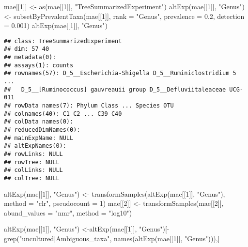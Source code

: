 \documentclass[
  oneside]{book}
\newenvironment{Shaded}{\begin{snugshade}}{\end{snugshade}}
\newcommand{\AttributeTok}[1]{\textcolor[rgb]{0.77,0.63,0.00}{#1}}
\newcommand{\DecValTok}[1]{\textcolor[rgb]{0.00,0.00,0.81}{#1}}
\newcommand{\FloatTok}[1]{\textcolor[rgb]{0.00,0.00,0.81}{#1}}
\newcommand{\FunctionTok}[1]{\textcolor[rgb]{0.00,0.00,0.00}{#1}}
\newcommand{\NormalTok}[1]{#1}
\newcommand{\OtherTok}[1]{\textcolor[rgb]{0.56,0.35,0.01}{#1}}
\newcommand{\SpecialCharTok}[1]{\textcolor[rgb]{0.00,0.00,0.00}{#1}}
\newcommand{\StringTok}[1]{\textcolor[rgb]{0.31,0.60,0.02}{#1}}
\begin{document}
\begin{Shaded}
\begin{Highlighting}[]
\NormalTok{mae[[}\DecValTok{1}\NormalTok{]] }\OtherTok{\textless{}{-}} \FunctionTok{as}\NormalTok{(mae[[}\DecValTok{1}\NormalTok{]], }\StringTok{"TreeSummarizedExperiment"}\NormalTok{)}
\FunctionTok{altExp}\NormalTok{(mae[[}\DecValTok{1}\NormalTok{]], }\StringTok{"Genus"}\NormalTok{) }\OtherTok{\textless{}{-}} \FunctionTok{subsetByPrevalentTaxa}\NormalTok{(mae[[}\DecValTok{1}\NormalTok{]], }\AttributeTok{rank =} \StringTok{"Genus"}\NormalTok{, }\AttributeTok{prevalence =} \FloatTok{0.2}\NormalTok{, }\AttributeTok{detection =} \FloatTok{0.001}\NormalTok{)}
\FunctionTok{altExp}\NormalTok{(mae[[}\DecValTok{1}\NormalTok{]], }\StringTok{"Genus"}\NormalTok{)}
\end{Highlighting}
\end{Shaded}

\begin{verbatim}
## class: TreeSummarizedExperiment 
## dim: 57 40 
## metadata(0):
## assays(1): counts
## rownames(57): D_5__Escherichia-Shigella D_5__Ruminiclostridium 5 ...
##   D_5__[Ruminococcus] gauvreauii group D_5__Defluviitaleaceae UCG-011
## rowData names(7): Phylum Class ... Species OTU
## colnames(40): C1 C2 ... C39 C40
## colData names(0):
## reducedDimNames(0):
## mainExpName: NULL
## altExpNames(0):
## rowLinks: NULL
## rowTree: NULL
## colLinks: NULL
## colTree: NULL
\end{verbatim}

\begin{Shaded}
\begin{Highlighting}[]
\FunctionTok{altExp}\NormalTok{(mae[[}\DecValTok{1}\NormalTok{]], }\StringTok{"Genus"}\NormalTok{) }\OtherTok{\textless{}{-}} \FunctionTok{transformSamples}\NormalTok{(}\FunctionTok{altExp}\NormalTok{(mae[[}\DecValTok{1}\NormalTok{]], }\StringTok{"Genus"}\NormalTok{), }\AttributeTok{method =} \StringTok{"clr"}\NormalTok{, }\AttributeTok{pseudocount =} \DecValTok{1}\NormalTok{)}
\NormalTok{mae[[}\DecValTok{2}\NormalTok{]] }\OtherTok{\textless{}{-}} \FunctionTok{transformSamples}\NormalTok{(mae[[}\DecValTok{2}\NormalTok{]], }\AttributeTok{abund\_values =} \StringTok{"nmr"}\NormalTok{, }\AttributeTok{method =} \StringTok{"log10"}\NormalTok{)}
\end{Highlighting}
\end{Shaded}

\begin{Shaded}
\begin{Highlighting}[]
\FunctionTok{altExp}\NormalTok{(mae[[}\DecValTok{1}\NormalTok{]], }\StringTok{"Genus"}\NormalTok{) }\OtherTok{\textless{}{-}}\FunctionTok{altExp}\NormalTok{(mae[[}\DecValTok{1}\NormalTok{]], }\StringTok{"Genus"}\NormalTok{)[}\SpecialCharTok{{-}}\FunctionTok{grep}\NormalTok{(}\StringTok{"uncultured|Ambiguous\_taxa"}\NormalTok{, }
                                                              \FunctionTok{names}\NormalTok{(}\FunctionTok{altExp}\NormalTok{(mae[[}\DecValTok{1}\NormalTok{]], }\StringTok{"Genus"}\NormalTok{))),]}
\end{Highlighting}
\end{Shaded}
\end{document}
